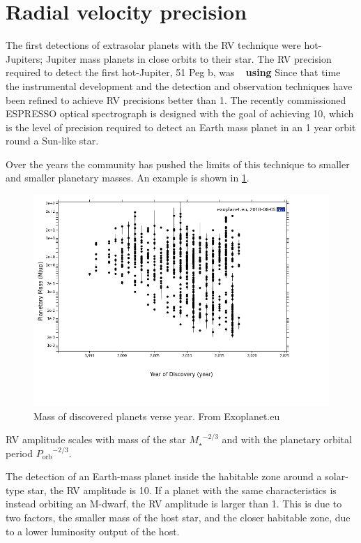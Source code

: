 
\section{Radial velocity precision}
\label{section:rv_precision}
The first detections of extrasolar planets with the {RV} technique were hot-Jupiters; Jupiter mass planets in close orbits to their star.
The RV precision required to detect the first hot-Jupiter, 51 Peg b, was ~\cite{mayor_jupitermass_1995} \textbf{using } Since that time the instrumental development and the detection and observation techniques have been refined to achieve {RV} precisions better than 1\mps{}.
The recently commissioned ESPRESSO optical spectrograph is designed with the goal of achieving 10\cmps{}, which is the level of precision required to detect an Earth mass planet in an 1 year orbit round a Sun-like star.

Over the years the community has pushed the limits of this technique to smaller and smaller planetary masses.
An example is shown in \cref{fig:year_mass}.

\begin{figure}
    \includegraphics[width=0.8\linewidth]{figures/year_planet_mass.png}
    \caption{Mass of discovered planets verse year.
        From Exoplanet.eu}
    \label{fig:year_mass}
\end{figure}


{RV} amplitude scales with mass of the star \({M_{\star}}^{-2/3}\) and with the planetary orbital period \({P_{\textrm{orb}}}^{-2/3}\).

The detection of an Earth-mass planet inside the habitable zone around a solar-type star, the {RV} amplitude is 10\cmps{}.
If a planet with the same characteristics is instead orbiting an {M-dwarf}, the {RV} amplitude is larger than 1\mps{}.
This is due to two factors, the smaller mass of the host star, and the closer habitable zone, due to a lower luminosity output of the host.

